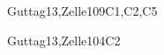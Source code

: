 \begin{syllabus}
\begin{unit}{\SDFAlgorithmsandDesign}{}{Guttag13,Zelle10}{9}{C1,C2,C5}
    \begin{topics}
        \item \SDFAlgorithmsandDesignTopicThe
        \item \SDFAlgorithmsandDesignTopicTheRole
        \item \SDFAlgorithmsandDesignTopicProblem
        \item \SDFAlgorithmsandDesignTopicFundamental
    \end{topics}

    \begin{learningoutcomes}
        \item \SDFAlgorithmsandDesignLODiscussTheAlgorithms [\Familiarity]
        \item \SDFAlgorithmsandDesignLODiscussHowMay [\Familiarity] 
        \item \SDFAlgorithmsandDesignLOCreateAlgorithms [\Usage] 
        \item \SDFAlgorithmsandDesignLOUseAToAnd [\Usage] 
        \item \SDFAlgorithmsandDesignLOImplementTest [\Usage] 
        \item \SDFAlgorithmsandDesignLODetermineWhetherOr [\Assessment] 
        \item \SDFAlgorithmsandDesignLOImplementAConquer [\Usage] 
        \item \SDFAlgorithmsandDesignLOApplyTheDecomposition [\Usage] 
        \item \SDFAlgorithmsandDesignLOIdentifyTheAnd [\Usage] 
        \item \SDFAlgorithmsandDesignLOImplementAData [\Usage] 
        \item \SDFAlgorithmsandDesignLOIdentifyTheAndMultiple [\Assessment] 
    \end{learningoutcomes}
\end{unit}

\begin{unit}{\PLObjectOrientedProgramming}{}{Guttag13,Zelle10}{4}{C2}
    \begin{topics}
        \item \PLObjectOrientedProgrammingTopicObjectOriented
        \item \PLObjectOrientedProgrammingTopicDefinition
        \item \PLObjectOrientedProgrammingTopicSubclasses
        \item \PLObjectOrientedProgrammingTopicSubtyping
        \item \PLObjectOrientedProgrammingTopicObjectOriented
    \end{topics}


\end{unit}
\end{syllabus}
